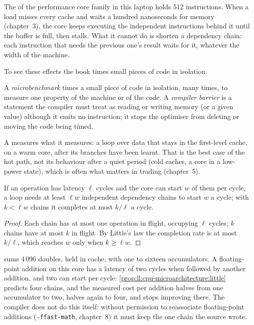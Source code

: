 The  of the performance core family in this laptop holds 512 instructions. When a load misses every cache
and waits a hundred nanoseconds for memory (chapter~3), the core keeps executing the independent instructions behind
it until the buffer is full, then stalls. What it cannot do is shorten a dependency chain: each instruction that
needs the previous one's result waits for it, whatever the width of the machine.

To see these effects the book times small pieces of code in isolation.

\begin{definition}\label{def:ll:cpu-microarchitecture:ubench}
A \emph{microbenchmark} times a small piece of code in isolation, many times, to measure one
property of the machine or of the code. A \emph{compiler barrier} is a statement the compiler
must treat as reading or writing memory (or a given value) although it emits no instruction; it stops the optimiser
from deleting or moving the code being timed.
\end{definition}

A  measures what it measures: a loop over data that stays in the first-level cache, on a warm core,
after its branches have been learnt. That is the best case of the hot path, not its behaviour after a quiet period
(cold caches, a core in a low-power state), which is often what matters in trading (chapter~5).

\begin{proposition}\label{prop:ll:cpu-microarchitecture:little}
If an operation has latency $\ell$ cycles and the core can start $w$ of them per cycle, a loop needs at least $\ell w$
independent dependency chains to start $w$ a cycle; with $k < \ell w$ chains it completes at most $k/\ell$ a cycle.
\end{proposition}

\begin{proof}
Each chain has at most one operation in flight, occupying $\ell$ cycles; $k$ chains have at most $k$ in flight. By
Little's law the completion rate is at most $k/\ell$, which reaches $w$ only when $k \ge \ell w$.
\end{proof}

 sums 4\,096 doubles, held in cache, with one to sixteen accumulators. A
floating-point addition on this core has a latency of two cycles when followed by another addition, and two can start
per cycle: \cref{prop:ll:cpu-microarchitecture:little} predicts four chains, and the measured cost per addition halves
from one accumulator to two, halves again to four, and stops improving there. The compiler does not do this itself:
without permission to reassociate floating-point additions (\texttt{-ffast-math}, chapter~8) it must keep the one
chain the source wrote.

